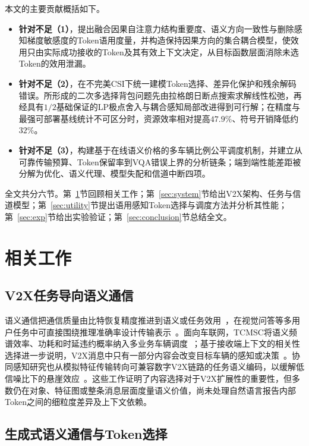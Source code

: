 \documentclass[journal]{IEEEtran}
\begin{document}
本文的主要贡献概括如下。
\begin{itemize}
\item \textbf{针对不足（1）}，提出融合因果自注意力结构重要度、语义方向一致性与删除感知梯度敏感度的Token语用度量，并构造保持因果方向的集合耦合模型，使效用只由实际成功接收的Token及其有效上下文决定，从目标函数层面消除未选Token的效用泄漏。
\item \textbf{针对不足（2）}，在不完美CSI下统一建模Token选择、差异化保护和残余解码错误。所形成的二次多选择背包问题先由拉格朗日断点搜索求解线性松弛，再经具有$1/2$基础保证的LP极点舍入与耦合感知局部改进得到可行解；在精度与最强可部署基线统计不可区分时，资源效率相对提高$47.9\%$、符号开销降低约$32\%$。
\item \textbf{针对不足（3）}，构建基于在线语义价格的多车辆比例公平调度机制，并建立从可靠传输预算、Token保留率到VQA错误上界的分析链条；端到端性能差距被分解为优化、语义代理、模型失配和信道中断四项。
\end{itemize}

全文共分六节。第~\ref{sec:related}节回顾相关工作；第~\ref{sec:system}节给出V2X架构、任务与信道模型；第~\ref{sec:utility}节提出语用感知Token选择与调度方法并分析其性能；第~\ref{sec:exp}节给出实验验证；第~\ref{sec:conclusion}节总结全文。

\section{相关工作}
\label{sec:related}

\subsection{V2X任务导向语义通信}

语义通信把通信质量由比特恢复精度推进到语义或任务效用~\cite{gunduz2023beyond,xie2021deep}，在视觉问答等多用户任务中可直接围绕推理准确率设计传输表示~\cite{xie2021task}。面向车联网，TCMSC将语义频谱效率、功耗和时延违约概率纳入多业务车辆调度~\cite{yuan2025tcmsc}；基于接收端上下文的相关性选择进一步说明，V2X消息中只有一部分内容会改变目标车辆的感知或决策~\cite{lusvarghi2026relevance}。协同感知研究也从模拟特征传输转向可兼容数字V2X链路的任务语义编码，以缓解低信噪比下的悬崖效应~\cite{gan2026cods}。这些工作证明了内容选择对于V2X扩展性的重要性，但多数仍在对象、特征图或整条消息层面度量语义价值，尚未处理自然语言报告内部Token之间的细粒度差异及上下文依赖。

\subsection{生成式语义通信与Token选择}
\end{document}
